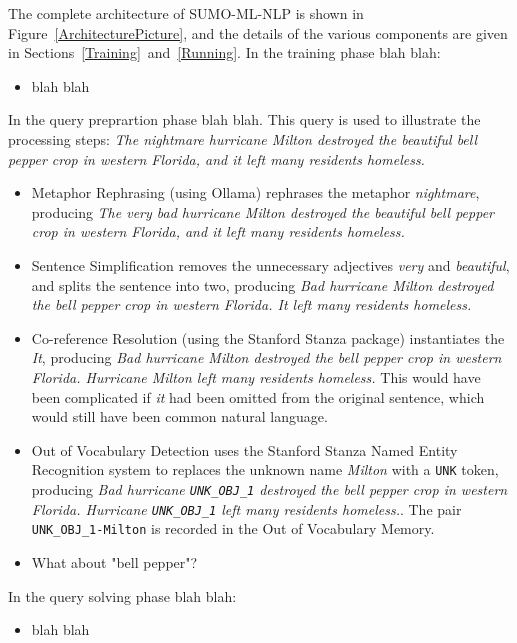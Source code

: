 \documentclass[runningheads]{llncs}
\begin{document}
The complete architecture of SUMO-ML-NLP is shown in Figure~\ref{ArchitecturePicture}, and the
details of the various components are given in Sections~\ref{Training}~and~\ref{Running}.
In the training phase blah blah:
\begin{itemize}
\item blah blah
\end{itemize}

In the query preprartion phase blah blah.
This query is used to illustrate the processing steps:
\emph{The nightmare hurricane Milton destroyed the beautiful bell pepper crop in western Florida, 
and it left many residents homeless.}
\begin{itemize}
\item Metaphor Rephrasing (using Ollama) rephrases the metaphor \emph{nightmare}, producing 
      \emph{The very bad hurricane Milton destroyed the beautiful bell pepper crop in western 
      Florida, and it left many residents homeless.}
\item Sentence Simplification removes the unnecessary adjectives \emph{very} and \emph{beautiful}, 
      and splits the sentence into two, producing \emph{Bad hurricane Milton destroyed the bell 
      pepper crop in western Florida. It left many residents homeless.}
\item Co-reference Resolution (using the Stanford Stanza package) instantiates the \emph{It}, 
      producing \emph{Bad hurricane Milton destroyed the bell pepper crop in western Florida. 
      Hurricane Milton left many residents homeless.}
      This would have been complicated if \emph{it} had been omitted from the original sentence,
      which would still have been common natural language.
\item Out of Vocabulary Detection uses the Stanford Stanza Named Entity Recognition system to
      replaces the unknown name \emph{Milton} with a \texttt{UNK} token, producing \emph{Bad 
      hurricane \texttt{UNK\_OBJ\_1} destroyed the bell pepper crop in western Florida.
      Hurricane \texttt{UNK\_OBJ\_1} left many residents homeless.}.
      The pair \texttt{UNK\_OBJ\_1-Milton} is recorded in the Out of Vocabulary Memory.
\item What about "bell pepper"?
\end{itemize}

In the query solving phase blah blah:
\begin{itemize}
\item blah blah
\end{itemize}
\end{document}
